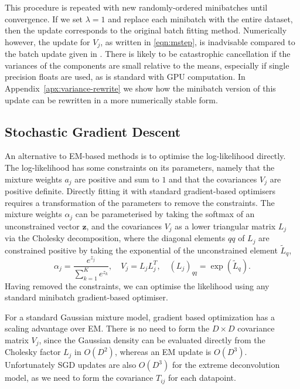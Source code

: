 \documentclass{article}
\begin{document}
This procedure is repeated with new randomly-ordered minibatches until convergence.
If we set $\lambda=1$ and replace each minibatch with the entire dataset,
then the update corresponds to the original batch fitting method.
Numerically however, the update for $V_j$, as written in \eqref{eqn:mstep}, is inadvisable compared to the batch update given in \cite{bovyExtremeDeconvolutionInferring2011}. There is likely to be catastrophic cancellation if the variances of the components are small relative to the means, especially if single precision floats are used, as is standard with GPU computation.
In Appendix~\ref{apx:variance-rewrite} we show how the minibatch version of this update can be rewritten in a
more numerically stable form.


\subsection{Stochastic Gradient Descent}

An alternative to EM-based methods is to optimise the log-likelihood directly.
The log-likelihood has some constraints on its parameters, namely that the mixture weights $a_j$ are positive and sum to $1$ and that the covariances $V_j$ are positive definite.
Directly fitting it with standard gradient-based optimisers requires a transformation of the parameters to remove the constraints.
The mixture weights $\alpha_j$ can be parameterised by taking the softmax of an unconstrained vector $\mathbf{z}$, and the covariances $V_j$ as a lower triangular matrix $L_j$ via the Cholesky decomposition, where the diagonal elements $qq$ of $L_j$ are constrained positive by taking the exponential of the unconstrained element $\tilde{L}_q$,
\begin{equation}
\alpha_j = \frac{e^{z_j}}{\sum_{k=1}^K e^{z_k}}, \quad
V_j = L_jL_j^T, \quad
(L_j)_{qq} = \exp({\tilde{L}_q}).
\end{equation}
Having removed the constraints, we can optimise the likelihood using any standard minibatch gradient-based optimiser.

For a standard Gaussian mixture model, gradient based optimization has a scaling advantage over EM\@. There is no need to form the $D\!\times\!D$ covariance matrix $V_j$, since the Gaussian density can be evaluated directly from the Cholesky factor $L_j$ in $O(D^2)$, whereas an EM update is $O(D^3)$.
Unfortunately SGD updates are also $O(D^3)$ for the extreme deconvolution model, as we need to form the covariance $T_{ij}$ for each datapoint.
\end{document}
